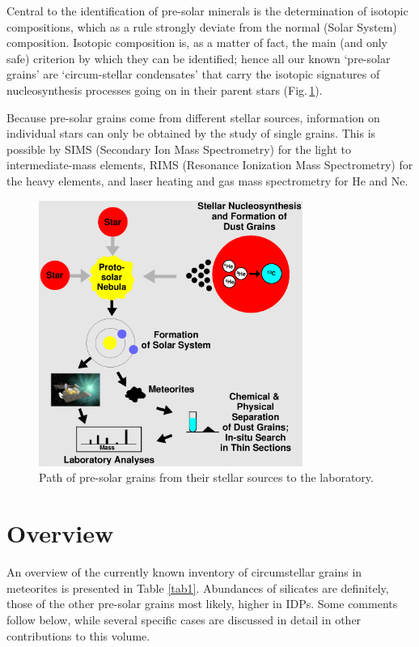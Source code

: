 \documentclass{iau}
\begin{document}
Central to the identification of pre-solar minerals is the determination of isotopic
compositions, which as a rule strongly deviate from the normal (Solar System) composition.
Isotopic composition is, as a matter of fact, the main (and only safe) criterion by which they
can be identified; hence all our known `pre-solar grains' are `circum-stellar condensates' that
carry the isotopic signatures of nucleosynthesis processes going on in their parent stars
(Fig.\,\ref{fig1}).

Because pre-solar grains come from different stellar sources, information on individual
stars can only be obtained by the study of single grains. This is possible by SIMS (Secondary
Ion Mass Spectrometry) for the light to intermediate-mass elements, RIMS (Resonance
Ionization Mass Spectrometry) for the heavy elements, and laser heating and gas mass
spectrometry for He and Ne.

\begin{figure}[b]
\begin{center}
 \includegraphics[width=3.4in]{Path.eps} 
 \caption{Path of pre-solar grains from their stellar sources to the laboratory.}
   \label{fig1}
\end{center}
\end{figure}

\section{Overview}

An overview of the currently known inventory of circumstellar grains in meteorites is
presented in Table \ref{tab1}. Abundances of silicates are definitely, those of the other pre-solar
grains most likely, higher in IDPs. Some comments follow below, while several specific cases
are discussed in detail in other contributions to this volume.
\end{document}
